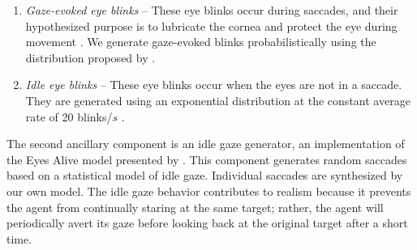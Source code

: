 \begin{enumerate}
\item \emph{Gaze-evoked eye blinks} -- These eye blinks occur during saccades, and their hypothesized purpose is to lubricate the cornea and protect the eye during movement \cite{evinger1994lookleap}. We generate gaze-evoked blinks probabilistically using the distribution proposed by \citet{peters2010animating}.
\item \emph{Idle eye blinks} -- These eye blinks occur when the eyes are not in a saccade. They are generated using an exponential distribution at the constant average rate of 20 blinks/$s$ \cite{bentivoglio1997blinkrate}.
\end{enumerate}

The second ancillary component is an idle gaze generator, an implementation of the Eyes Alive model presented by \citet{lee2002eyes}. This component generates random saccades based on a statistical model of idle gaze. Individual saccades are synthesized by our own model. The idle gaze behavior contributes to realism because it prevents the agent from continually staring at the same target; rather, the agent will periodically avert its gaze before looking back at the original target after a short time.